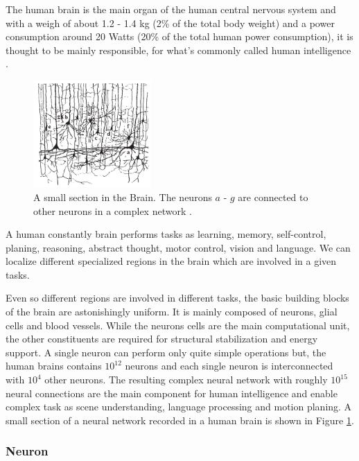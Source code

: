The human brain is the main organ of the human central nervous system and with a weigh of about 1.2 - 1.4 kg (2\% of the total body weight) and a power consumption around 20 Watts (20\% of the total human power consumption), it is thought to be mainly responsible, for what's commonly called human intelligence \cite{gerstner2014neuronal}\cite{Byrne1997}.  

\begin{figure}
	\centering
    	\includegraphics[width=0.4\textwidth]{imgs/brain.png} 
    \caption{A small section in the Brain. The neurons $a$ - $g$ are connected to other neurons in a complex network \cite{gerstner2014neuronal}.}
	\label{fig:brain}
\end{figure}

A human constantly brain performs tasks as learning, memory, self-control, planing, reasoning, abstract thought, motor control, vision and language.
We can localize different specialized regions in the brain which are involved in a given tasks. 

Even so different regions are involved in different tasks, the basic building blocks of the brain are astonishingly uniform. 
It is mainly composed of neurons, glial cells and blood vessels.
While the neurons cells are the main computational unit, the other constituents are required for structural stabilization and energy support.
A single neuron can perform only quite simple operations but, the human brains contains $10^{12}$ neurons and each single neuron is interconnected with $10^{4}$ other neurons.
The resulting complex neural network with roughly $10^{15}$ neural connections are the main component for human intelligence and enable complex task as scene understanding, language processing and motion planing. A small section of a neural network recorded in a human brain is shown in Figure \ref{fig:brain}. 

\subsubsection{Neuron} \label{c:natneuron}

